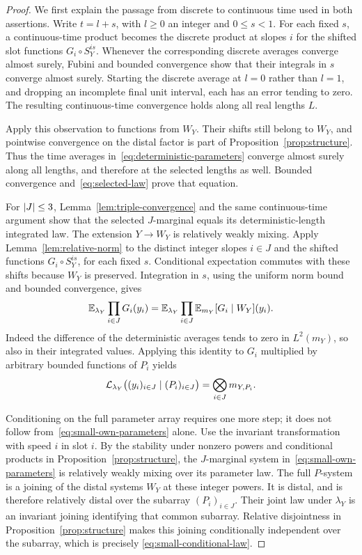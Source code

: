 \begin{proof}
We first explain the passage from discrete to continuous time used
in both assertions.  Write $t=l+s$, with $l\ge0$ an integer and
$0\le s<1$.  For each fixed $s$, a continuous-time product becomes
the discrete product at slopes $i$ for the shifted slot functions
$G_i\circ S_Y^{is}$.  Whenever the corresponding discrete averages
converge almost surely, Fubini and bounded convergence show that
their integrals in $s$ converge almost surely.  Starting the discrete
average at $l=0$ rather than $l=1$, and dropping an incomplete final
unit interval, each has an error tending to zero.  The resulting
continuous-time convergence holds along all real lengths $L$.

Apply this observation to functions from $W_Y$.  Their shifts still
belong to $W_Y$, and pointwise convergence on the distal factor is
part of Proposition~\ref{prop:structure}.  Thus the time averages
in~\eqref{eq:deterministic-parameters} converge almost surely along
all lengths, and therefore at the selected lengths as well.  Bounded
convergence and~\eqref{eq:selected-law} prove that equation.

For $\lvert J\rvert\le3$, Lemma~\ref{lem:triple-convergence} and the same
continuous-time argument show that the selected $J$-marginal equals
its deterministic-length integrated law.  The extension
$Y\to W_Y$ is relatively weakly mixing.  Apply
Lemma~\ref{lem:relative-norm} to the distinct integer slopes
$i\in J$ and the shifted functions $G_i\circ S_Y^{is}$, for each
fixed $s$.  Conditional expectation commutes with these shifts
because $W_Y$ is preserved.  Integration in $s$, using the uniform
norm bound and bounded convergence, gives
\begin{equation}\label{eq:small-replacement}
 \mathbb E_{\lambda_Y}\prod_{i\in J}G_i(y_i)
 =\mathbb E_{\lambda_Y}\prod_{i\in J}
    \mathbb E_{m_Y}[G_i\mid W_Y](y_i).
\end{equation}
Indeed the difference of the deterministic averages tends to zero
in $L^2(m_Y)$, so also in their integrated values.  Applying this
identity to $G_i$ multiplied by arbitrary bounded functions of
$P_i$ yields
\begin{equation}\label{eq:small-own-parameters}
 \mathcal L_{\lambda_Y}\bigl((y_i)_{i\in J}\mid(P_i)_{i\in J}\bigr)
 =\bigotimes_{i\in J}m_{Y,P_i}.
\end{equation}

Conditioning on the full parameter array requires one more step;
it does not follow from~\eqref{eq:small-own-parameters} alone.
Use the invariant transformation with speed $i$ in slot $i$.
By the stability under nonzero powers and conditional products in
Proposition~\ref{prop:structure}, the $J$-marginal system
in~\eqref{eq:small-own-parameters} is relatively weakly mixing over
its parameter law.  The full $P$-system is a joining of the distal
systems $W_Y$ at these integer powers.  It is distal, and is
therefore relatively distal over the subarray $(P_i)_{i\in J}$.
Their joint law under $\lambda_Y$ is an invariant joining
identifying that common subarray.  Relative disjointness in
Proposition~\ref{prop:structure} makes this joining conditionally
independent over the subarray, which is precisely
\eqref{eq:small-conditional-law}.
\end{proof}

